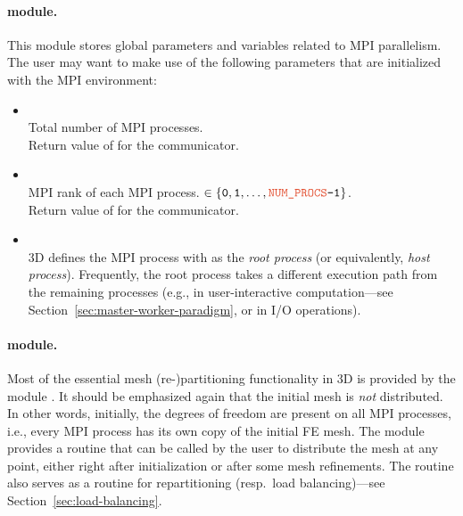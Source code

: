 \paragraph{ module.} This module stores global parameters and variables related to MPI parallelism. The user may want to make use of the following parameters that are initialized with the MPI environment:
\begin{itemize}
	\item {} \\
	Total number of MPI processes. \\
	Return value of  for the  communicator.
	\item {} \\
	MPI rank of each MPI process.  $\in \{ \code{0}, \code{1}, \dots, \code{\var{NUM\_PROCS}-1} \}$. \\
	Return value of  for the  communicator.
	\item {} \\
	\hp3D defines the MPI process with  as the \emph{root process} (or equivalently, \emph{host process}). Frequently, the root process takes a different execution path from the remaining processes (e.g., in user-interactive computation---see Section~\ref{sec:master-worker-paradigm}, or in I/O operations).
\end{itemize}

\paragraph{ module.}
Most of the essential mesh (re-)partitioning functionality in \hp3D is provided by the module . It should be emphasized again that the initial mesh is \emph{not} distributed. In other words, initially, the degrees of freedom are present on all MPI processes, i.e., every MPI process has its own copy of the initial FE mesh. The  module provides a  routine that can be called by the user to distribute the mesh at any point, either right after initialization or after some mesh refinements. The  routine also serves as a routine for repartitioning (resp.\ load balancing)---see Section~\ref{sec:load-balancing}.

